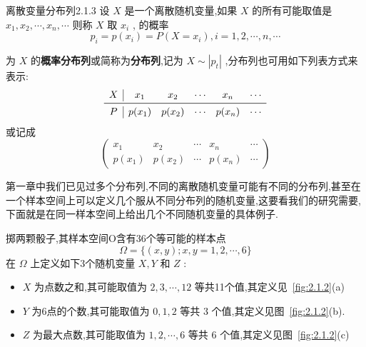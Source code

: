 \begin{definition}{离散变量分布列}{2.1.3}
	设 $ X $ 是一个离散随机变量,如果 $ X $ 的所有可能取值是 $ x_1,x_{2}, \cdots, x_{n}, \cdots $ 则称 $ X $ 取 $ x_i $ , 的概率
	\begin{equation} 
	p_{i}=p\left(x_{i}\right)=P\left(X=x_{i}\right), i=1,2, \cdots, n, \cdots \label{eq:2.1.2}
	\end{equation}
	
	为 $ X $ 的\textbf{概率分布列}或简称为\textbf{分布列},记为 $ X \sim\left|p_{t}\right| $ ,分布列也可用如下列表方式来表示:
	\[
	\begin{array}{c|ccccc}
	X	&    x_{1}     &    x_{2}     &    \cdots     &     x_{n}    &   \cdots \\\midrule
	P	&    p(x_1)     &    p(x_2)     &    \cdots     &    p(x_n)     &   \cdots \\
	\end{array}
	\]
	或记成	
	\[ 
	\left( \begin{array}{ccccc}{x_{1}} & {x_{2}} & {\cdots} & {x_{n}} & {\cdots} \\ {p\left(x_{1}\right)} & {p\left(x_{2}\right)} & {\cdots} & {p\left(x_{n}\right)} & {\cdots}\end{array}\right)
	\]
	
\end{definition}


第一章中我们已见过多个分布列,不同的离散随机变量可能有不同的分布列,甚至在一个样本空间上可以定义几个服从不同分布列的随机变量,这要看我们的研究需要,下面就是在同一样本空间上给出几个不同随机变量的具体例子.
\begin{example}\label{exam:2.1.3}
	掷两颗骰子,其样本空间O含有36个等可能的样本点
	\[ 
	\Omega=\{(x, y) ; x, y=1,2, \cdots, 6\}
	\]
	在 $ \Omega $ 上定义如下3个随机变量 $ X,Y $ 和 $ Z $ :
	\begin{itemize}
		\item $ X $ 为点数之和,其可能取值为 $ 2,3, \cdots, 12 $ 等共11个值,其定义见~\ref{fig:2.1.2}(a)
		\item $ Y $ 为6点的个数,其可能取值为 $ 0,1,2 $ 等共 $ 3 $ 个值,其定义见图~\ref{fig:2.1.2}(b).
		\item $ Z $ 为最大点数,其可能取值为 $ 1,2, \cdots, 6 $ 等共 $ 6 $ 个值,其定义见图~\ref{fig:2.1.2}(c)
	\end{itemize}
\end{example}


